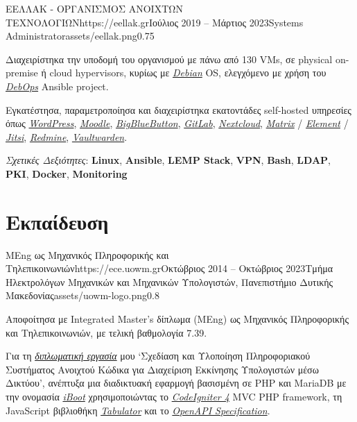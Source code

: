 \documentclass{mycv}
\begin{document}
	\vspace{0.5cm}

	\begin{EntryDatedLogo}{ΕΕΛΛΑΚ - ΟΡΓΑΝΙΣΜΟΣ ΑΝΟΙΧΤΩΝ ΤΕΧΝΟΛΟΓΙΩΝ}{https://eellak.gr}{Ιούλιος 2019 -- Μάρτιος 2023}{Systems Administrator}{assets/eellak.png}{0.75}
		\begin{Itemize}
			\item Διαχειρίστηκα την υποδομή του οργανισμού με πάνω από 130 VMs, σε physical on-premise ή cloud hypervisors, κυρίως με \href{https://www.debian.org}{\textit{Debian}} OS, ελεγχόμενο με χρήση του \href{https://debops.org}{\textit{DebOps}} Ansible project.
			\item Εγκατέστησα, παραμετροποίησα και διαχειρίστηκα εκατοντάδες self-hosted υπηρεσίες όπως \href{https://wordpress.com}{\textit{WordPress}}, \href{https://moodle.org}{\textit{Moodle}}, \href{https://bigbluebutton.org}{\textit{BigBlueButton}}, \href{https://about.gitlab.com/install/}{\textit{GitLab}}, \href{https://nextcloud.com}{\textit{Nextcloud}}, \href{https://matrix.org}{\textit{Matrix}} / \href{https://element.io}{\textit{Element}} / \href{https://jitsi.org}{\textit{Jitsi}}, \href{https://www.redmine.org/}{\textit{Redmine}}, \href{https://vaultwarden.discourse.group/}{\textit{Vaultwarden}}.
		\end{Itemize}
		\vspace{-0.3cm}
		\textit{Σχετικές Δεξιότητες}: \textbf{Linux}, \textbf{Ansible}, \textbf{LEMP Stack}, \textbf{VPN}, \textbf{Bash}, \textbf{LDAP}, \textbf{PKI}, \textbf{Docker}, \textbf{Monitoring}
	\end{EntryDatedLogo}

	\section{Εκπαίδευση}
	\begin{EntryDatedLogo}{MEng ως Μηχανικός Πληροφορικής και Τηλεπικοινωνιών}{https://ece.uowm.gr}{Οκτώβριος 2014 -- Οκτώβριος 2023}{Τμήμα Ηλεκτρολόγων Μηχανικών και Μηχανικών Υπολογιστών, Πανεπιστήμιο Δυτικής Μακεδονίας}{assets/uowm-logo.png}{0.8}
		\begin{Itemize}
			\item Αποφοίτησα με Integrated Master's δίπλωμα (MΕng) ως Μηχανικός Πληροφορικής και Τηλεπικοινωνιών, με τελική βαθμολογία 7.39.
			\item Για τη \href{https://github.com/ChrisKar96/Thesis}{\textit{διπλωματική εργασία}} μου `Σχεδίαση και Υλοποίηση Πληροφοριακού Συστήματος Ανοιχτού Κώδικα για Διαχείριση Εκκίνησης Υπολογιστών μέσω Δικτύου', ανέπτυξα μια διαδικτυακή εφαρμογή βασισμένη σε PHP και MariaDB με την ονομασία \href{https://github.com/ChrisKar96/iBoot-Thesis}{\textit{iBoot}} χρησιμοποιώντας το \href{https://codeigniter.com/}{\textit{CodeIgniter 4}} MVC PHP framework, τη JavaScript βιβλιοθήκη \href{https://tabulator.info/}{\textit{Tabulator}} και το \href{https://swagger.io/specification/}{\textit{OpenAPI Specification}}.
		\end{Itemize}
	\end{EntryDatedLogo}
\end{document}

